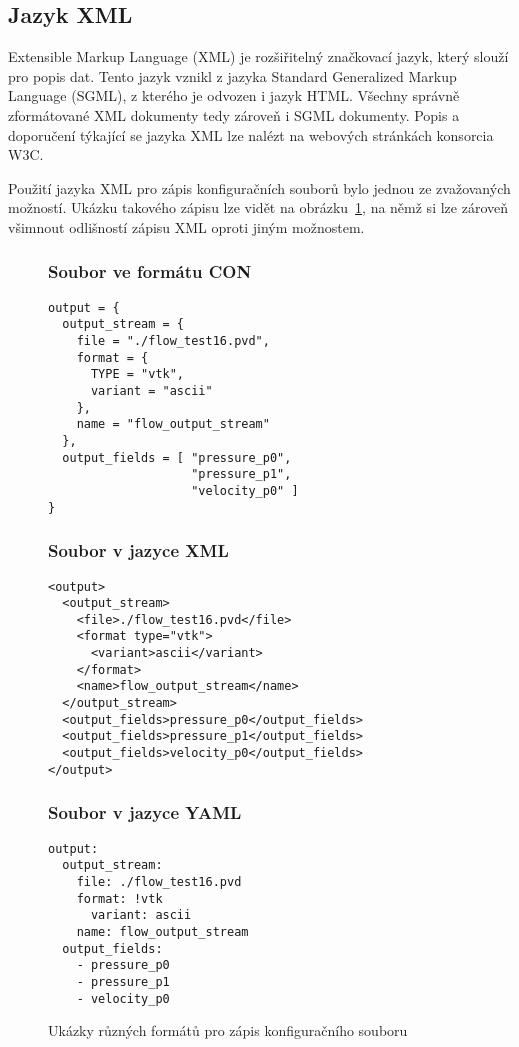 \documentclass[FM,bw,DP]{tulthesis}
\begin{document}
\subsection{Jazyk XML}

Extensible Markup Language (XML) je rozšiřitelný značkovací jazyk, který slouží pro popis dat. Tento jazyk vznikl z jazyka Standard Generalized Markup Language (SGML), z kterého je odvozen i jazyk HTML. Všechny správně zformátované XML dokumenty tedy zároveň i SGML dokumenty. Popis a doporučení týkající se jazyka XML lze nalézt na webových stránkách konsorcia W3C.

Použití jazyka XML pro zápis konfiguračních souborů bylo jednou ze zvažovaných možností. Ukázku takového zápisu lze vidět na obrázku~\ref{img:conf_files}, na němž si lze zároveň všimnout odlišností zápisu XML oproti jiným možnostem.  

\begin{figure}[H]
\singlespacing
\subsubsection*{Soubor ve formátu CON}
\begin{lstlisting}
output = {
  output_stream = {
    file = "./flow_test16.pvd", 
    format = {
      TYPE = "vtk", 
      variant = "ascii"
    }, 
    name = "flow_output_stream"
  }, 
  output_fields = [ "pressure_p0",
                    "pressure_p1", 
                    "velocity_p0" ]
}
\end{lstlisting}

\subsubsection*{Soubor v jazyce XML}
\begin{lstlisting}
<output>
  <output_stream>
  	<file>./flow_test16.pvd</file>
  	<format type="vtk">
  	  <variant>ascii</variant>
  	</format>
  	<name>flow_output_stream</name>
  </output_stream>
  <output_fields>pressure_p0</output_fields>
  <output_fields>pressure_p1</output_fields>
  <output_fields>velocity_p0</output_fields>
</output>
\end{lstlisting}

\subsubsection*{Soubor v jazyce YAML}
\begin{lstlisting}
output:
  output_stream:
  	file: ./flow_test16.pvd
  	format: !vtk
  	  variant: ascii
  	name: flow_output_stream
  output_fields:
    - pressure_p0
    - pressure_p1
    - velocity_p0
\end{lstlisting}
\onehalfspacing
\caption{Ukázky různých formátů pro zápis konfiguračního souboru}
\label{img:conf_files}
\end{figure}
\end{document}
